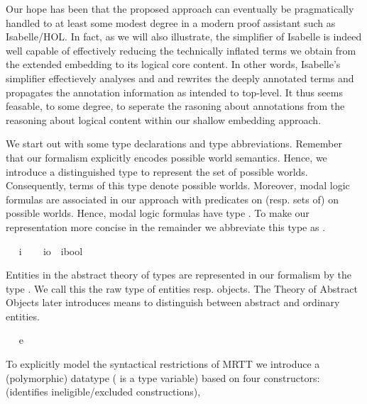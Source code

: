 \begin{isabellebody}
\begin{isamarkuptext}
  Our hope has been that the proposed approach can eventually be pragmatically handled to 
  at least some modest degree in a modern proof assistant such as Isabelle/HOL. In fact, as we will also
  illustrate, the simplifier  of Isabelle is indeed well capable of effectively reducing
  the technically inflated terms we obtain from the extended embedding to its logical core content.  
  In other words, Isabelle's simplifier effectievely analyses and and rewrites the 
  deeply annotated terms and propagates the annotation information as intended to top-level.
  It thus seems feasable, to some degree, to seperate the rasoning about annotations from 
  the reasoning about logical content within our shallow embedding approach.%
\end{isamarkuptext}\isamarkuptrue%
%
\isamarkuptrue%
%
\begin{isamarkuptext}%
We start out with some type declarations and type abbreviations. 
  Remember that our formalism explicitly encodes possible world semantics. Hence, we introduce a 
  distinguished type  to represent the set of possible worlds. 
  Consequently, terms of this type denote possible worlds. 
  Moreover, modal logic formulas are associated in our approach with
  predicates on (resp. sets of) on possible worlds. Hence, modal logic formulas have
  type . To make our representation  more concise in the remainder
  we abbreviate this type as .%
\end{isamarkuptext}\isamarkuptrue%
\ \isamarkupfalse%
\ i\ \isanewline
\ \isamarkupfalse%
\ io\ {\isacharequal}\ {\isachardoublequoteopen}{\isacharparenleft}i{\isasymRightarrow}bool{\isacharparenright}{\isachardoublequoteclose}%
\begin{isamarkuptext}%
Entities in the abstract theory of types are represented in our formalism by the
  type . We call this the raw type of entities resp. objects. The Theory of Abstract Objects 
  later introduces means to distinguish between abstract and ordinary entities.%
\end{isamarkuptext}\isamarkuptrue%
\ \isamarkupfalse%
\ e%
\begin{isamarkuptext}%
To explicitly model the syntactical restrictions of MRTT we introduce a 
  (polymorphic) datatype  ( is a type variable) 
  based on four constructors:  (identifies ineligible/excluded constructions),  

\end{isamarkuptext}
\end{isabellebody}
